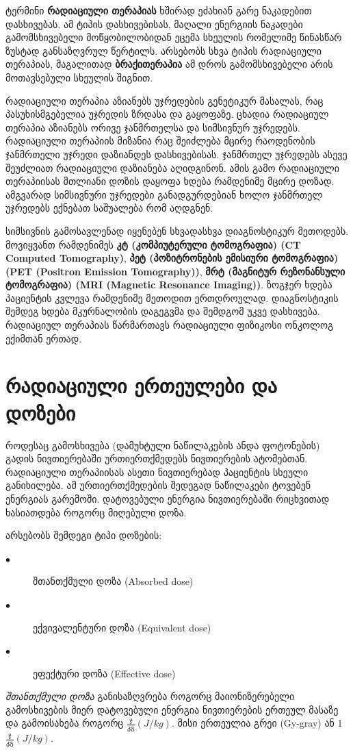 \documentclass[12pt,a4paper,]{report}
\begin{document}
ტერმინი \textbf{რადიაციული თერაპიას} ხშირად ეძახიან  გარე ნაკადებით დასხივებას. ამ ტიპის დასხივებისას, მაღალი ენერგიის ნაკადები გამომსხივებელი მოწყობილობიდან ეცემა სხეულის რომელიმე წინასწარ ზუსტად განსაზღვრულ წერტილს. არსებობს სხვა ტიპის რადიაციული თერაპიას, მაგალითად \textbf{ბრაქითერაპია}\cite{brachytherapy} ამ დროს გამომსხივებელი არის მოთავსებული სხეულის შიგნით. 

რადიაციული თერაპია აზიანებს უჯრედების გენეტიკურ მასალას, რაც პასუხისმგებელია უჯრედის ზრდასა და გაყოფაზე. ცხადია რადიაციულ თერაპია აზიანებს ორივე ჯანმრთელსა და სიმსივნურ უჯრედებს. რადიაციული თერაპიის მიზანია რაც შეიძლება მცირე რაოდენობის ჯანმრთელი უჯრედი დაზიანდეს დასხივებისას. ჯანმრთელ უჯრედებს ასევე შეუძლიათ რადიაციული დაზიანება აღიდგინონ. ამის გამო რადიაციული თერაპიისას მთლიანი დოზის დაყოფა ხდება რამდენიმე მცირე დოზად. ამგვარად სიმსივნური უჯრედები განადგურდებიან ხოლო ჯანმრთელ უჯრედებს ექნებათ საშუალება რომ აღდგნენ.

სიმსივნის გამოსავლენად იყენებენ სხვადასხვა დიაგნოსტიკურ მეთოდებს. მოვიყვანთ რამდენიმეს \textbf{კტ (კომპიუტერული ტომოგრაფია) (CT Computed Tomography)}, \textbf{პეტ (პოზიტრონების ემისიური ტომოგრაფია) (PET (Positron Emission Tomography))}, \textbf{მრტ (მაგნიტურ რეზონანსული ტომოგრაფია) (MRI (Magnetic Resonance Imaging))}. ზოგჯერ ხდება პაციენტის კვლევა რამდენიმე მეთოდით ერთდროულად. დიაგნოსტიკის შემდეგ ხდება მკურნალობის დაგეგვმა და შემდგომ უკვე დასხივება. რადიაციულ თერაპიას წარმართავს რადიაციული ფიზიკოსი ონკოლოგ ექიმთან ერთად. 

\chapter{რადიაციული ერთეულები და დოზები}
როდესაც გამოსხივება (დამუხტული ნაწილაკების ანდა ფოტონების) გადის ნივთიერებაში ურთიერთქმედებს ნივთიერების ატომებთან. რადიაციული თერაპიისას ასეთი ნივთიერებად პაციენტის სხეული განიხილება. ამ ურთიერთქმედების შედეგად ნაწილაკები ტოვებენ ენერგიას გარემოში. დატოვებული ენერგია ნივთიერებაში რიცხვითად ხასიათდება როგორც მიღებული დოზა. 

არსებობს შემდეგი ტიპი დოზების:
	\begin{description}
      \item[$\bullet$] შთანთქმული დოზა  (Absorbed dose)
      \item[$\bullet$] ექვივალენტური დოზა (Equivalent dose)
      \item[$\bullet$] ეფექტური დოზა (Effective dose)
    \end{description}
    
\textit{შთანთქმული დოზა} განისაზღვრება როგორც მაიონიზერებელი გამოსხივების მიერ დატოვებული ენერგია ნივთიერების ერთეულ მასაზე და გამოისახება როგორც $\frac{\text{ჯ}}{\text{კგ}} (J/kg)$. მისი ერთეულია გრეი (Gy-gray) ან 1$\frac{\text{ჯ}}{\text{კგ}} (J/kg)$.
\end{document}
